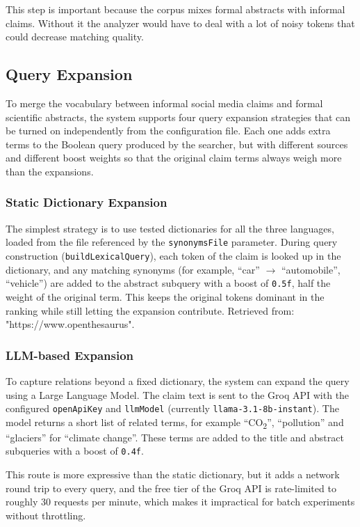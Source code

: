 This step is important because the corpus mixes formal abstracts with informal claims. Without it the analyzer would have to deal with a lot of noisy tokens that could decrease matching quality.

\subsection{Query Expansion}

To merge the vocabulary between informal social media claims and formal scientific abstracts, the system supports four query expansion strategies that can be turned on independently from the configuration file. Each one adds extra terms to the Boolean query produced by the searcher, but with different sources and different boost weights so that the original claim terms always weigh more than the expansions.

\subsubsection{Static Dictionary Expansion}

The simplest strategy is to use tested dictionaries for all the three languages, loaded from the file referenced by the \texttt{synonymsFile} parameter. During query construction (\texttt{buildLexicalQuery}), each token of the claim is looked up in the dictionary, and any matching synonyms (for example, ``car'' $\rightarrow$ ``automobile'', ``vehicle'') are added to the abstract subquery with a boost of \texttt{0.5f}, half the weight of the original term. This keeps the original tokens dominant in the ranking while still letting the expansion contribute. Retrieved from: "https://www.openthesaurus".
\subsubsection{LLM-based Expansion}

To capture relations beyond a fixed dictionary, the system can expand the query using a Large Language Model. The claim text is sent to the Groq API with the configured \texttt{openApiKey} and \texttt{llmModel} (currently \texttt{llama-3.1-8b-instant}). The model returns a short list of related terms, for example ``CO\textsubscript{2}'', ``pollution'' and ``glaciers'' for ``climate change''. These terms are added to the title and abstract subqueries with a boost of \texttt{0.4f}.

This route is more expressive than the static dictionary, but it adds a network round trip to every query, and the free tier of the Groq API is rate-limited to roughly 30 requests per minute, which makes it impractical for batch experiments without throttling.

